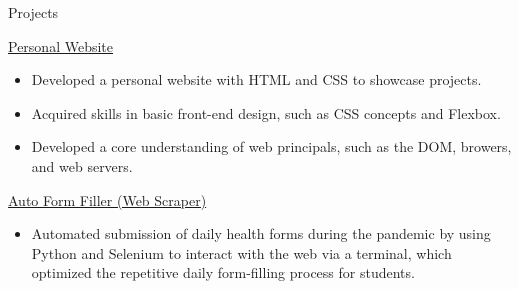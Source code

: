 \documentclass{article}
\newlength{\tabin}
\newlength{\secsep}
\newcommand{\lineunder}{\vspace*{-8pt} \\ \hspace*{-6pt} \hrulefill \\ \vspace*{-15pt}}
\newenvironment{tabbedsection}[1]{
  \begin{list}{}{
      \setlength{\itemsep}{0pt}
      \setlength{\labelsep}{0pt}
      \setlength{\labelwidth}{0pt}
      \setlength{\leftmargin}{\tabin}
      \setlength{\rightmargin}{\tabin}
      \setlength{\listparindent}{0pt}
      \setlength{\parsep}{0pt}
      \setlength{\parskip}{0pt}
      \setlength{\partopsep}{0pt}
      \setlength{\topsep}{#1}
    }
  \item[]
}{\end{list}}
\newenvironment{resume_section}[1]{
  \filbreak
  \vspace{2\secsep}
  \textsc{\large#1}
  \lineunder
  \begin{tabbedsection}{\secsep}
}{\end{tabbedsection}}
\newenvironment{resume_subsection}[2][]{
  \textbf{#2} \hfill {\footnotesize #1} \hspace{-5.1em}
  \begin{tabbedsection}{0.5\secsep}
}{\end{tabbedsection}}
\newenvironment{subitems}{
  \renewcommand{\labelitemi}{-}
  \begin{itemize}
      \setlength{\labelsep}{1em}
}{\end{itemize}}
\begin{document}
\begin{resume_section}{Projects}
  \begin{resume_subsection}[]{\href{https://github.com/TwinkletoesZen/Personal-Website}{Personal Website \faGithub}}
    \begin{subitems}
      \item Developed a personal website with HTML and CSS to showcase projects.
      \item Acquired skills in basic front-end design, such as CSS concepts and Flexbox.
      \item Developed a core understanding of web principals, such as the DOM, browers, and web servers.
    \end{subitems}
  \end{resume_subsection}

  \begin{resume_subsection}[]{\href{https://github.com/TwinkletoesZen/Auto-HealthCheck-Completer}{Auto Form Filler (Web Scraper) \faGithub}}
    \begin{subitems}
      \item Automated submission of daily health forms during the pandemic by using Python and Selenium to interact with the web via a terminal, which optimized the repetitive daily form-filling process for students.
    \end{subitems}
  \end{resume_subsection}



\end{resume_section}
\end{document}
